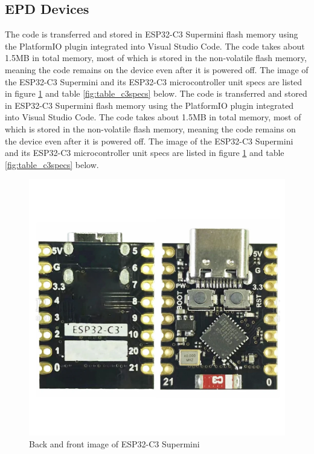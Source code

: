 \documentclass[../Main.tex]{subfiles}
\begin{document}
\subsection{EPD Devices}
The code is transferred and stored in ESP32-C3 Supermini flash memory using the PlatformIO plugin integrated into Visual Studio Code. The code takes about 1.5MB in total memory, most of which is stored in the non-volatile flash memory, meaning the code remains on the device even after it is powered off. The image of the ESP32-C3 Supermini and its ESP32-C3 microcontroller unit specs are listed in figure \ref{fig:esp32-c3} and table \ref{fig:table_c3specs} below.
The code is transferred and stored in ESP32-C3 Supermini flash memory using the PlatformIO plugin integrated into Visual Studio Code. The code takes about 1.5MB in total memory, most of which is stored in the non-volatile flash memory, meaning the code remains on the device even after it is powered off. The image of the ESP32-C3 Supermini and its ESP32-C3 microcontroller unit specs are listed in figure \ref{fig:esp32-c3} and table \ref{fig:table_c3specs} below.

\begin{figure}[H]
    \centering
    \includegraphics[width=0.75\linewidth]{doc//imgs/esp32-c3.png}
    \caption{Back and front image of ESP32-C3 Supermini}
    \label{fig:esp32-c3}
\end{figure}
\end{document}
